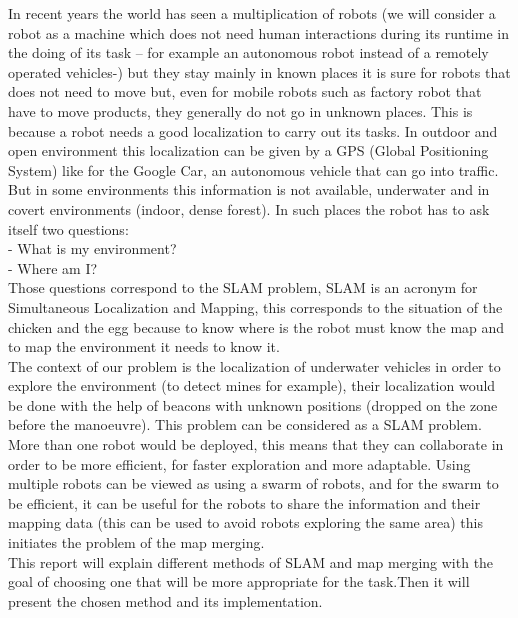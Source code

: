 In recent years the world has seen a multiplication of robots (we will consider a robot as a machine which does not need human interactions during its runtime in the doing of its task – for example an autonomous robot instead of a remotely operated vehicles-) but they stay mainly in known places it is sure for robots that does not need to move but, even for mobile robots such as factory robot that have to move products, they generally do not go in unknown places. This is because a robot needs a good localization to carry out its tasks. In outdoor and open environment this localization can be given by a GPS (Global Positioning System) like for the Google Car, an autonomous vehicle that can go into traffic. But in some environments this information is not available, underwater and in covert environments (indoor, dense forest). In such places the robot has to ask itself two questions:\\

-	What is my environment?\\

-	Where am I?\\

Those questions correspond to the SLAM problem, SLAM is an acronym for Simultaneous Localization and Mapping, this corresponds to the situation of the chicken and the egg because to know where is the robot must know the map and to map the environment it needs to know it.\\

The context of our problem is the localization of underwater vehicles in order to explore the environment (to detect mines for example), their localization would be done with the help of beacons with unknown positions (dropped on the zone before the manoeuvre).  This problem can be considered as a SLAM problem.\\
More than one robot would be deployed, this means that they can collaborate in order to be more efficient, for faster exploration and more adaptable. Using multiple robots can be viewed as using a swarm of robots, and  for the swarm to be efficient, it can be useful for the robots to share the information and their mapping data (this can be used to avoid robots exploring the same area)  this initiates the problem of the map merging.\\

This report will explain different methods of SLAM and map merging with the goal of choosing one that will be more appropriate for the task.Then it will present the chosen method and its implementation.
